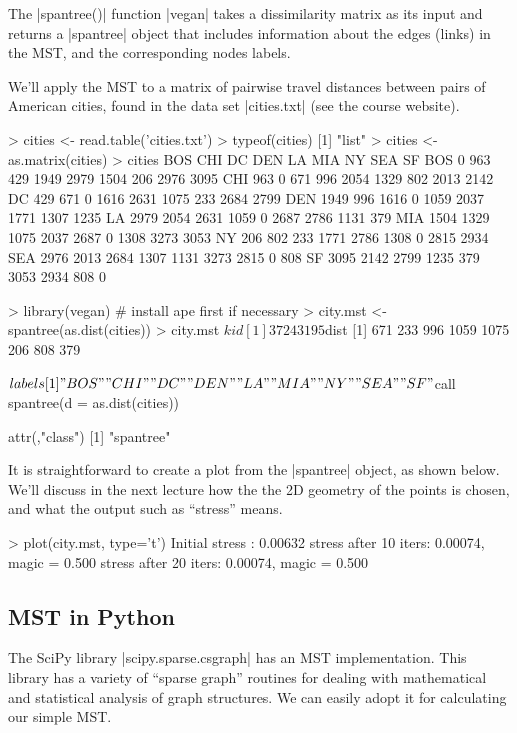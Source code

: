 The |spantree()| function |vegan| takes a dissimilarity matrix as its input and returns a |spantree| object that includes information about the edges (links) in the MST, and the corresponding nodes labels.

We'll apply the MST to a matrix of pairwise travel distances between pairs of American cities, found in the data set |cities.txt| (see the course website).

\begin{R}
> cities <- read.table('cities.txt')
> typeof(cities)
[1] "list"
> cities <- as.matrix(cities)
> cities
     BOS  CHI   DC  DEN   LA  MIA   NY  SEA   SF
BOS    0  963  429 1949 2979 1504  206 2976 3095
CHI  963    0  671  996 2054 1329  802 2013 2142
DC   429  671    0 1616 2631 1075  233 2684 2799
DEN 1949  996 1616    0 1059 2037 1771 1307 1235
LA  2979 2054 2631 1059    0 2687 2786 1131  379
MIA 1504 1329 1075 2037 2687    0 1308 3273 3053
NY   206  802  233 1771 2786 1308    0 2815 2934
SEA 2976 2013 2684 1307 1131 3273 2815    0  808
SF  3095 2142 2799 1235  379 3053 2934  808    0

> library(vegan) # install ape first if necessary
> city.mst <- spantree(as.dist(cities))
> city.mst
$kid
[1] 3 7 2 4 3 1 9 5

$dist
[1]  671  233  996 1059 1075  206  808  379

$labels
[1] "BOS" "CHI" "DC"  "DEN" "LA"  "MIA" "NY"  "SEA" "SF" 

$call
spantree(d = as.dist(cities))

attr(,"class")
[1] "spantree"
\end{R}

It is straightforward to create a plot from the |spantree| object, as shown below.  We'll discuss in the next lecture how the the 2D geometry of the points is chosen, and what the output such as ``stress'' means. 

\begin{R}
> plot(city.mst, type='t')
Initial stress        : 0.00632
stress after  10 iters: 0.00074, magic = 0.500
stress after  20 iters: 0.00074, magic = 0.500
\end{R}%

\subsection{MST in Python}

The SciPy library |scipy.sparse.csgraph| has an MST implementation.  This library has a variety of ``sparse graph'' routines for dealing with mathematical and statistical analysis of graph structures.  We can easily adopt it for calculating our simple MST.

